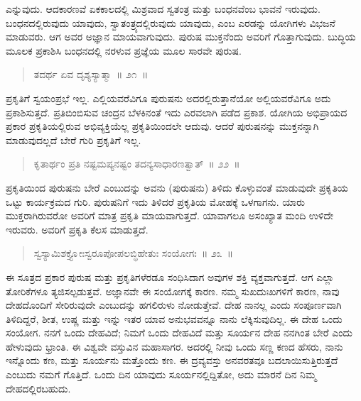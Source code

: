 ಎನ್ನುವುದು. ಆದಕಾರಣವೆ ಏಕಕಾಲದಲ್ಲಿ ಮಿಶ್ರವಾದ ಸ್ವತಂತ್ರ ಮತ್ತು ಬಂಧನವೆಂಬ ಭಾವನೆ ಇರುವುದು. ಬಂಧನದಲ್ಲಿರುವುದು ಯಾವುದು, ಸ್ವಾತಂತ್ರ್ಯದಲ್ಲಿರುವುದು ಯಾವುದು, ಎಂಬ ಎರಡನ್ನು ಯೋಗಿಗಳು ವಿಭಜನೆ ಮಾಡುವರು. ಆಗ ಅವರ ಅಜ್ಞಾನ ಮಾಯವಾಗುವುದು. ಪುರುಷ ಮುಕ್ತನೆಂದು ಅವರಿಗೆ ಗೊತ್ತಾಗುವುದು. ಬುದ್ಧಿಯ ಮೂಲಕ ಪ್ರಕಾಶಿಸಿ ಬಂಧನದಲ್ಲಿ ನರಳುವ ಪ್ರಜ್ಞೆಯ ಮೂಲ ಸಾರವೇ ಪುರುಷ. 

\vspace{-0.3cm}

\begin{verse}
ತದರ್ಥ ಏವ ದೃಶ್ಯಸ್ಯಾತ್ಮಾ~॥ ೨೧~॥
\end{verse}

\vspace{-0.3cm}


ಪ್ರಕೃತಿಗೆ ಸ್ವಯಂಪ್ರಭೆ ಇಲ್ಲ. ಎಲ್ಲಿಯವರೆವಿಗೂ ಪುರುಷನು ಅದರಲ್ಲಿರುತ್ತಾನೆಯೋ ಅಲ್ಲಿಯವರೆವಿಗೂ ಅದು ಪ್ರಕಾಶಿಸುತ್ತದೆ. ಪ್ರತಿಬಿಂಬಿಸುವ ಚಂದ್ರನ ಬೆಳಕಿನಂತೆ ಇದು ಎರವಲಾಗಿ ಪಡೆದ ಪ್ರಕಾಶ. ಯೋಗಿಯ ಅಭಿಪ್ರಾಯದ ಪ್ರಕಾರ ಪ್ರಕೃತಿಯಲ್ಲಿರುವ ಅಭಿವ್ಯಕ್ತಿಯೆಲ್ಲ ಪ್ರಕೃತಿಯಿಂದಲೇ ಆದುವು. ಆದರೆ ಪುರುಷನನ್ನು ಮುಕ್ತನನ್ನಾಗಿ ಮಾಡುವುದಲ್ಲದೆ ಬೇರೆ ಗುರಿ ಪ್ರಕೃತಿಗೆ ಇಲ್ಲ. 

\vspace{-0.3cm}

\begin{verse}
ಕೃತಾರ್ಥಂ ಪ್ರತಿ ನಷ್ಟಮಪ್ಯನಷ್ಟಂ ತದನ್ಯಸಾಧಾರಣತ್ವಾತ್​~॥ ೨೨~॥
\end{verse}

\vspace{-0.3cm}


ಪ್ರಕೃತಿಯಿಂದ ಪುರುಷನು ಬೇರೆ ಎಂಬುದನ್ನು ಅವನು (ಪುರುಷನು) ತಿಳಿದು ಕೊಳ್ಳುವಂತೆ ಮಾಡುವುದೇ ಪ್ರಕೃತಿಯ ಒಟ್ಟು ಕಾರ್ಯಕ್ರಮದ ಗುರಿ. ಪುರುಷನಿಗೆ ಇದು ತಿಳಿದರೆ ಪ್ರಕೃತಿಯ ಮೋಹಕ್ಕೆ ಒಳಗಾಗನು. ಯಾರು ಮುಕ್ತರಾಗಿರುವರೋ ಅವರಿಗೆ ಮಾತ್ರ ಪ್ರಕೃತಿ ಮಾಯವಾಗುತ್ತದೆ. ಯಾವಾಗಲೂ ಅಸಂಖ್ಯಾತ ಮಂದಿ ಉಳಿದೇ ಇರುವರು. ಅವರಿಗೆ ಪ್ರಕೃತಿ ಕೆಲಸ ಮಾಡುತ್ತದೆ. 

\vspace{-0.3cm}

\begin{verse}
ಸ್ವಸ್ಯಾಮಿಶಕ್ತ್ಯೋಃಸ್ವರೂಪೋಪಲಬ್ಧಿಹೇತುಃ ಸಂಯೋಗಃ~॥ ೨೩~॥
\end{verse}

\vspace{-0.3cm}


ಈ ಸೂತ್ರದ ಪ್ರಕಾರ ಪುರುಷ ಮತ್ತು ಪ್ರಕೃತಿಗಳೆರಡೂ ಸಂಧಿಸಿದಾಗ ಅವುಗಳ ಶಕ್ತಿ ವ್ಯಕ್ತವಾಗುತ್ತದೆ. ಆಗ ಎಲ್ಲಾ ತೋರಿಕೆಗಳೂ ತ್ಯಜಿಸಲ್ಪಡುತ್ತವೆ. ಅಜ್ಞಾನವೇ ಈ ಸಂಯೋಗಕ್ಕೆ ಕಾರಣ. ನಮ್ಮ ಸುಖದುಃಖಗಳಿಗೆ ಕಾರಣ, ನಾವು ದೇಹದೊಂದಿಗೆ ಸೇರಿರುವುದೇ ಎಂಬುದನ್ನು ಹಗಲಿರುಳು ನೋಡುತ್ತೇವೆ. ದೇಹ ನಾನಲ್ಲ ಎಂದು ಸಂಪೂರ್ಣವಾಗಿ ತಿಳಿದಿದ್ದರೆ, ಶೀತ, ಉಷ್ಣ ಮತ್ತು ಇನ್ನು ಇತರ ಯಾವ ಅನುಭವವನ್ನೂ ನಾನು ಲೆಕ್ಕಿಸುವುದಿಲ್ಲ. ಈ ದೇಹ ಒಂದು ಸಂಯೋಗ. ನನಗೆ ಒಂದು ದೇಹವಿದೆ; ನಿಮಗೆ ಒಂದು ದೇಹವಿದೆ ಮತ್ತು ಸೂರ್ಯನ ದೇಹ ನನಗಿಂತ ಬೇರೆ ಎಂದು ಹೇಳುವುದು ಭ್ರಾಂತಿ. ಈ ವಿಶ್ವವೇ ವಸ್ತುವಿನ ಮಹಾಸಾಗರ. ಅದರಲ್ಲಿ ನೀವು ಒಂದು ಸಣ್ಣ ಕಣದ ಹೆಸರು, ನಾನು ಇನ್ನೊಂದು ಕಣ, ಮತ್ತು ಸೂರ್ಯನು ಮತ್ತೊಂದು ಕಣ. ಈ ದ್ರವ್ಯವಸ್ತು ಅನವರತವೂ ಬದಲಾಯಿಸು\break ತ್ತಿರುತ್ತದೆ ಎಂಬುದು ನಮಗೆ ಗೊತ್ತಿದೆ. ಒಂದು ದಿನ ಯಾವುದು ಸೂರ್ಯನಲ್ಲಿದ್ದಿತೋ, ಅದು ಮಾರನೆ ದಿನ ನಿಮ್ಮ ದೇಹದಲ್ಲಿರಬಹುದು. 

